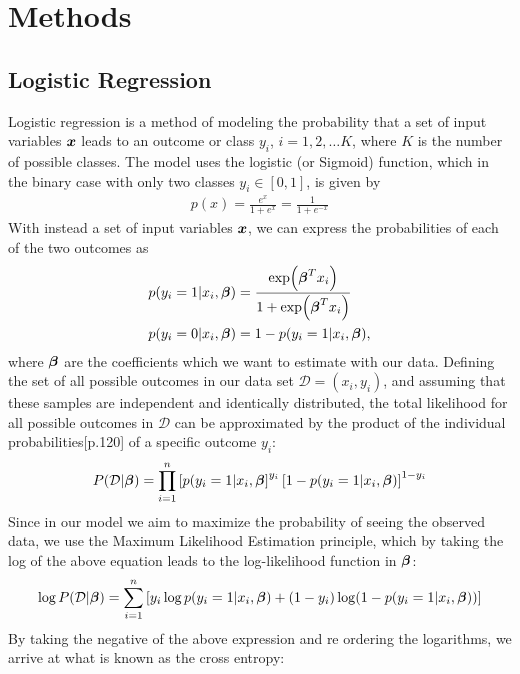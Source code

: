 \section{Methods}\label{sec:Methods}

\subsection{Logistic Regression}
Logistic regression is a method of modeling the probability that a set of input variables $\boldsymbol{x}$ leads to an outcome or class $y_i$, $i = 1, 2, \dots K$, where $K$ is the number of possible classes. The model uses the logistic (or Sigmoid) function, which in the binary case with only two classes $y_i \in [0, 1]$, is given by
\begin{align}
    p(x) = \frac{e^x}{1 + e^x} = \frac{1}{1 + e^{-x}}
    \label{eq:sigmoid}
\end{align}
With instead a set of input variables $\boldsymbol{x}$, we can express the probabilities of each of the two outcomes as
\begin{align}
    p(y_i = 1 | x_i, \boldsymbol{\beta}) &= \frac{\exp(\boldsymbol{\beta}^Tx_i)}{1 + \exp(\boldsymbol{\beta}^Tx_i)}\\
    p(y_i = 0 | x_i, \boldsymbol{\beta}) &= 1 - p(y_i = 1 | x_i, \boldsymbol{\beta}),
\end{align}
where $\boldsymbol{\beta}$ are the coefficients which we want to estimate with our data.
Defining the set of all possible outcomes in our data set $\mathcal{D} = {(x_i, y_i)}$, and assuming that these samples are independent and identically distributed, the total likelihood for all possible outcomes in $\mathcal{D}$ can be approximated by the product of the individual probabilities\cite{hastie}[p.120] of a specific outcome $y_i$:
\begin{align}
    P(\mathcal{D}|\boldsymbol{\beta}) = \prod_{i=1}^{n} \left[ p(y_i= 1 | x_i, \boldsymbol{\beta} \right]^{y_i} \left[ 1 - p(y_i= 1 | x_i, \boldsymbol{\beta}) \right]^{1 - y_i}
\end{align}
Since in our model we aim to maximize the probability of seeing the observed data, we use the Maximum Likelihood Estimation principle, which by taking the log of the above equation leads to the log-likelihood function in $\boldsymbol{\beta}$:
\begin{align}
    \log P(\mathcal{D}|\boldsymbol{\beta}) = \sum_{i=1}^n \left[ y_i \log p(y_i = 1| x_i, \boldsymbol{\beta}) + (1 - y_i)\log(1 - p(y_i = 1 | x_i, \boldsymbol{\beta}))
    \right]
\end{align}
By taking the negative of the above expression and re ordering the logarithms, we arrive at what is known as the cross entropy:
